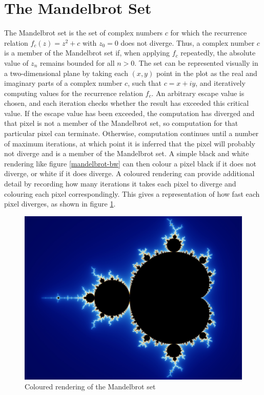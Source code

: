 \documentclass[bsc,frontabs,singlespacing,parskip,deptreport]{infthesis}
\begin{document}
\section{The Mandelbrot Set}
The Mandelbrot set is the set of complex numbers $c$ for which the recurrence relation $f_{c}(z) = z^2 +c$ with $z_{0}=0$ does not diverge. Thus, a complex number $c$ is a member of the Mandelbrot set if, when applying $f_{c}$ repeatedly, the absolute value of $z_{n}$ remains bounded for all $n>0$. The set can be represented visually in a two-dimensional plane by taking each $(x,y)$ point in the plot as the real and imaginary parts of a complex number $c$, such that $c=x+iy$, and iteratively computing values for the recurrence relation $f_{c}$. An arbitrary escape value is chosen, and each iteration checks whether the result has exceeded this critical value. If the escape value has been exceeded, the computation has diverged and that pixel is not a member of the Mandelbrot set, so computation for that particular pixel can terminate. Otherwise, computation continues until a number of maximum iterations, at which point it is inferred that the pixel will probably not diverge and is a member of the Mandelbrot set. A simple black and white rendering like figure \ref{mandelbrot-bw} can then colour a pixel black if it does not diverge, or white if it does diverge. A coloured rendering can provide additional detail by recording how many iterations it takes each pixel to diverge and colouring each pixel correspondingly. This gives a representation of how fast each pixel diverges, as shown in figure \ref{mandelbrot-vis}.

\begin{figure}[h]
    \centering
    \includegraphics[scale=0.7]{mandelbrot.jpg}
    \caption{Coloured rendering of the Mandelbrot set \cite{mandelbrot-set}}
    \label{mandelbrot-vis}
\end{figure}
\end{document}
